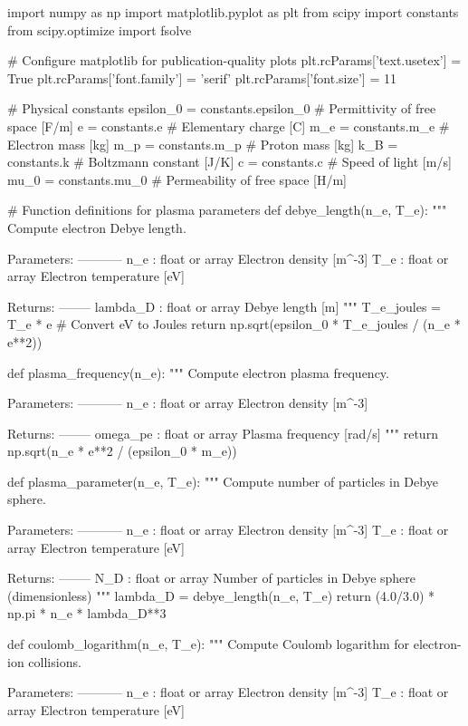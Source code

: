 \documentclass[11pt,a4paper]{article}
\begin{document}
\begin{pycode}
import numpy as np
import matplotlib.pyplot as plt
from scipy import constants
from scipy.optimize import fsolve

# Configure matplotlib for publication-quality plots
plt.rcParams['text.usetex'] = True
plt.rcParams['font.family'] = 'serif'
plt.rcParams['font.size'] = 11

# Physical constants
epsilon_0 = constants.epsilon_0  # Permittivity of free space [F/m]
e = constants.e  # Elementary charge [C]
m_e = constants.m_e  # Electron mass [kg]
m_p = constants.m_p  # Proton mass [kg]
k_B = constants.k  # Boltzmann constant [J/K]
c = constants.c  # Speed of light [m/s]
mu_0 = constants.mu_0  # Permeability of free space [H/m]

# Function definitions for plasma parameters
def debye_length(n_e, T_e):
    """
    Compute electron Debye length.

    Parameters:
    -----------
    n_e : float or array
        Electron density [m^-3]
    T_e : float or array
        Electron temperature [eV]

    Returns:
    --------
    lambda_D : float or array
        Debye length [m]
    """
    T_e_joules = T_e * e  # Convert eV to Joules
    return np.sqrt(epsilon_0 * T_e_joules / (n_e * e**2))

def plasma_frequency(n_e):
    """
    Compute electron plasma frequency.

    Parameters:
    -----------
    n_e : float or array
        Electron density [m^-3]

    Returns:
    --------
    omega_pe : float or array
        Plasma frequency [rad/s]
    """
    return np.sqrt(n_e * e**2 / (epsilon_0 * m_e))

def plasma_parameter(n_e, T_e):
    """
    Compute number of particles in Debye sphere.

    Parameters:
    -----------
    n_e : float or array
        Electron density [m^-3]
    T_e : float or array
        Electron temperature [eV]

    Returns:
    --------
    N_D : float or array
        Number of particles in Debye sphere (dimensionless)
    """
    lambda_D = debye_length(n_e, T_e)
    return (4.0/3.0) * np.pi * n_e * lambda_D**3

def coulomb_logarithm(n_e, T_e):
    """
    Compute Coulomb logarithm for electron-ion collisions.

    Parameters:
    -----------
    n_e : float or array
        Electron density [m^-3]
    T_e : float or array
        Electron temperature [eV]


\end{pycode}
\end{document}
